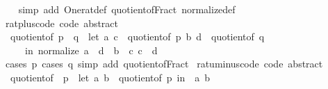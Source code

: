 \begin{isabellebody}
%
\isadelimproof
\ \ %
\endisadelimproof
%
\isatagproof
{}\isamarkupfalse%
\ {\isacharparenleft}{\kern0pt}simp\ add{\isacharcolon}{\kern0pt}\ One{\isacharunderscore}{\kern0pt}rat{\isacharunderscore}{\kern0pt}def\ quotient{\isacharunderscore}{\kern0pt}of{\isacharunderscore}{\kern0pt}Fract\ normalize{\isacharunderscore}{\kern0pt}def{\isacharparenright}{\kern0pt}%
\endisatagproof
{\isafoldproof}%
%
\isadelimproof
\isanewline
%
\endisadelimproof
\isanewline
{}\isamarkupfalse%
\ rat{\isacharunderscore}{\kern0pt}plus{\isacharunderscore}{\kern0pt}code\ {\isacharbrackleft}{\kern0pt}code\ abstract{\isacharbrackright}{\kern0pt}{\isacharcolon}{\kern0pt}\isanewline
\ \ {\isachardoublequoteopen}quotient{\isacharunderscore}{\kern0pt}of\ {\isacharparenleft}{\kern0pt}p\ {\isacharplus}{\kern0pt}\ q{\isacharparenright}{\kern0pt}\ {\isacharequal}{\kern0pt}\ {\isacharparenleft}{\kern0pt}let\ {\isacharparenleft}{\kern0pt}a{\isacharcomma}{\kern0pt}\ c{\isacharparenright}{\kern0pt}\ {\isacharequal}{\kern0pt}\ quotient{\isacharunderscore}{\kern0pt}of\ p{\isacharsemicolon}{\kern0pt}\ {\isacharparenleft}{\kern0pt}b{\isacharcomma}{\kern0pt}\ d{\isacharparenright}{\kern0pt}\ {\isacharequal}{\kern0pt}\ quotient{\isacharunderscore}{\kern0pt}of\ q\isanewline
\ \ \ \ \ in\ normalize\ {\isacharparenleft}{\kern0pt}a\ {\isacharasterisk}{\kern0pt}\ d\ {\isacharplus}{\kern0pt}\ b\ {\isacharasterisk}{\kern0pt}\ c{\isacharcomma}{\kern0pt}\ c\ {\isacharasterisk}{\kern0pt}\ d{\isacharparenright}{\kern0pt}{\isacharparenright}{\kern0pt}{\isachardoublequoteclose}\isanewline
%
\isadelimproof
\ \ %
\endisadelimproof
%
\isatagproof
{}\isamarkupfalse%
\ {\isacharparenleft}{\kern0pt}cases\ p{\isacharcomma}{\kern0pt}\ cases\ q{\isacharparenright}{\kern0pt}\ {\isacharparenleft}{\kern0pt}simp\ add{\isacharcolon}{\kern0pt}\ quotient{\isacharunderscore}{\kern0pt}of{\isacharunderscore}{\kern0pt}Fract{\isacharparenright}{\kern0pt}%
\endisatagproof
{\isafoldproof}%
%
\isadelimproof
\isanewline
%
\endisadelimproof
\isanewline
{}\isamarkupfalse%
\ rat{\isacharunderscore}{\kern0pt}uminus{\isacharunderscore}{\kern0pt}code\ {\isacharbrackleft}{\kern0pt}code\ abstract{\isacharbrackright}{\kern0pt}{\isacharcolon}{\kern0pt}\isanewline
\ \ {\isachardoublequoteopen}quotient{\isacharunderscore}{\kern0pt}of\ {\isacharparenleft}{\kern0pt}{\isacharminus}{\kern0pt}\ p{\isacharparenright}{\kern0pt}\ {\isacharequal}{\kern0pt}\ {\isacharparenleft}{\kern0pt}let\ {\isacharparenleft}{\kern0pt}a{\isacharcomma}{\kern0pt}\ b{\isacharparenright}{\kern0pt}\ {\isacharequal}{\kern0pt}\ quotient{\isacharunderscore}{\kern0pt}of\ p\ in\ {\isacharparenleft}{\kern0pt}{\isacharminus}{\kern0pt}\ a{\isacharcomma}{\kern0pt}\ b{\isacharparenright}{\kern0pt}{\isacharparenright}{\kern0pt}{\isachardoublequoteclose}\isanewline

\end{isabellebody}
